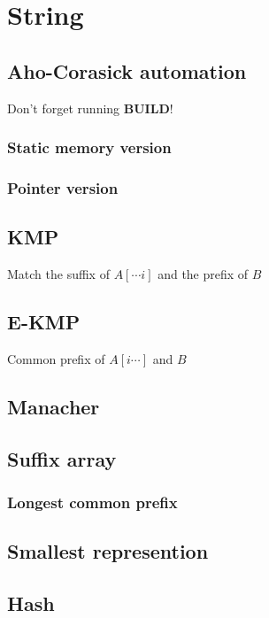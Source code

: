 \section{String}
\subsection{Aho-Corasick automation}
Don't forget running \textbf{BUILD}!
\subsubsection{Static memory version}

\subsubsection{Pointer version}


\subsection{KMP}
Match the suffix of $A[\cdots i]$ and the prefix of $B$


\subsection{E-KMP}
Common prefix of $A[i\cdots]$ and $B$


\subsection{Manacher}


\subsection{Suffix array}

\subsubsection{Longest common prefix}


\subsection{Smallest represention}


\subsection{Hash}
